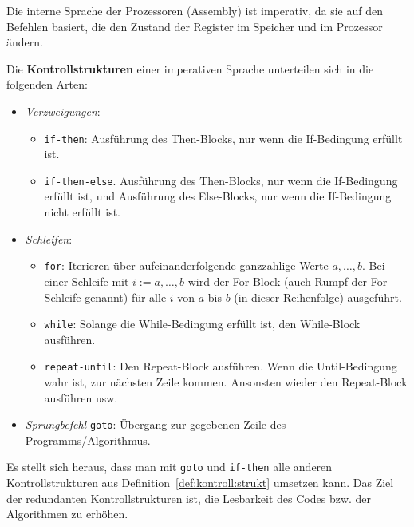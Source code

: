 \begin{bem}
	Die interne Sprache der Prozessoren (Assembly) ist imperativ, da sie auf den Befehlen basiert, die den Zustand der Register im Speicher und im Prozessor ändern. 
\end{bem} 

\begin{defn} \label{def:kontroll:strukt}
Die \textbf{Kontrollstrukturen} einer imperativen Sprache unterteilen sich in die folgenden Arten: 
\begin{itemize}
	\item \emph{Verzweigungen}: 
		\begin{itemize} 
			\item[] \texttt{if-then}: Ausführung des Then-Blocks, nur wenn die If-Bedingung erfüllt ist. 
			\item[] \texttt{if-then-else}.  Ausführung des Then-Blocks, nur wenn die If-Bedingung erfüllt ist, und Ausführung des Else-Blocks, nur wenn die If-Bedingung nicht erfüllt ist. 
		\end{itemize} 
	\item \emph{Schleifen}: 
		\begin{itemize} 
			\item[] \texttt{for}: Iterieren über aufeinanderfolgende ganzzahlige Werte $a,\ldots,b$. Bei einer Schleife mit $i:=a,\ldots,b$ wird der For-Block (auch Rumpf der For-Schleife genannt) für alle $i$ von $a$ bis $b$ (in dieser Reihenfolge) ausgeführt. 
			\item[] \texttt{while}: Solange die While-Bedingung erfüllt ist, den While-Block ausführen.
			\item[] \texttt{repeat-until}: Den Repeat-Block ausführen. Wenn die Until-Bedingung wahr ist, zur nächsten Zeile kommen. Ansonsten wieder den Repeat-Block ausführen usw. 
		\end{itemize} 
	\item \emph{Sprungbefehl} \texttt{goto}: Übergang zur gegebenen Zeile des Programms/Algorithmus. 
\end{itemize}
\end{defn} 

\begin{bem}
	Es stellt sich heraus, dass man mit \texttt{goto} und \texttt{if-then} alle anderen Kontrollstrukturen aus Definition~\ref{def:kontroll:strukt} umsetzen kann. Das Ziel der redundanten Kontrollstrukturen ist, die Lesbarkeit des Codes bzw. der Algorithmen zu erhöhen. 
\end{bem} 


